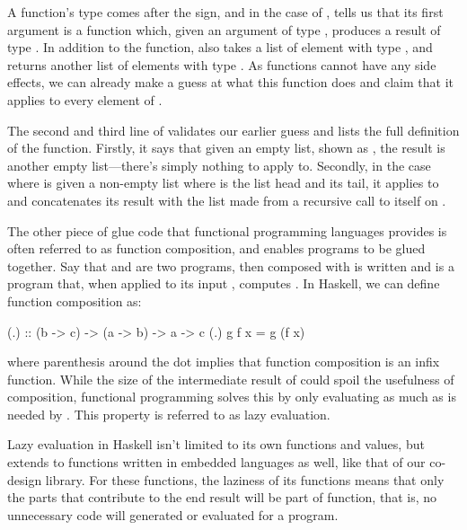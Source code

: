 \documentclass[../main.tex]{subfiles}
\begin{document}
A function's type comes after the \codei{::} sign, and in the case of , tells us that its first argument is a function  which, given an argument of type , produces a result of type . In addition to the function,  also takes a list  of element with type , and returns another list of elements with type . As functions cannot have any side effects, we can already make a guess at what this function does and claim that it applies  to every element of .

The second and third line of  validates our earlier guess and lists the full definition of the function. Firstly, it says that given an empty list, shown as \codei{[]}, the result is another empty list---there's simply nothing to apply  to. Secondly, in the case where  is given a non-empty list  where  is the list head and  its tail, it applies  to  and concatenates its result with the list made from a recursive call to itself on .

The other piece of glue code that functional programming languages provides is often referred to as function composition, and enables programs to be glued together. Say that  and  are two programs, then  composed with  is written  and is a program that, when applied to its input , computes . In Haskell, we can define function composition as:

\begin{code}
(.) :: (b -> c) -> (a -> b) -> a -> c
(.) g f x = g (f x)
\end{code}

\noindent where parenthesis around the dot implies that function composition is an infix function. While the size of the intermediate result of  could spoil the usefulness of composition, functional programming solves this by only evaluating  as much as is needed by . This property is referred to as lazy evaluation.

Lazy evaluation in Haskell isn't limited to its own functions and values, but extends to functions written in embedded languages as well, like that of our co-design library. For these functions, the laziness of its functions means that only the parts that contribute to the end result will be part of function, that is, no unnecessary code will generated or evaluated for a program.
\end{document}

